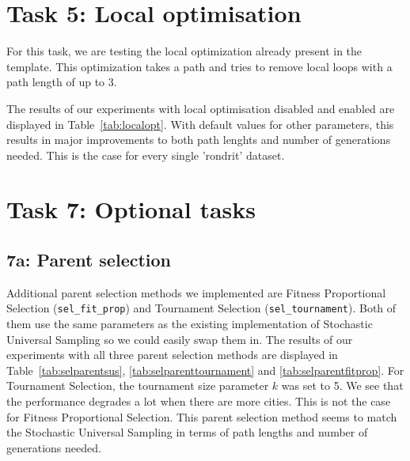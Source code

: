 \documentclass{report}
\begin{document}
\section{Task 5: Local optimisation}
\label{sec:local}
For this task, we are testing the local optimization already present in the template. This optimization takes a path and tries to remove local loops with a path length of up to 3.

The results of our experiments with local optimisation disabled and enabled are displayed in Table~\ref{tab:localopt}. With default values for other parameters, this results in major improvements to both path lenghts and number of generations needed. This is the case for every single 'rondrit' dataset.



\section{Task 7: Optional tasks}
\subsection{7a: Parent selection}
Additional parent selection methods we implemented are Fitness Proportional Selection (\texttt{sel\_fit\_prop}) and Tournament Selection (\texttt{sel\_tournament}). Both of them use the same parameters as the existing implementation of Stochastic Universal Sampling so we could easily swap them in.
The results of our experiments with all three parent selection methods are displayed in Table~\ref{tab:selparentsus}, \ref{tab:selparenttournament} and \ref{tab:selparentfitprop}. For Tournament Selection, the tournament size parameter $k$ was set to 5. We see that the performance degrades a lot when there are more cities. This is not the case for Fitness Proportional Selection. This parent selection method seems to match the Stochastic Universal Sampling in terms of path lengths and number of generations needed.
\end{document}
